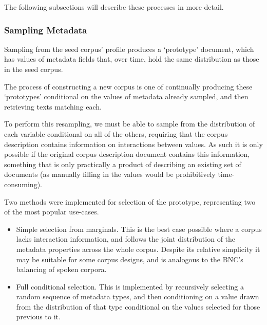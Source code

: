 The following subsections will describe these processes in more detail.

\subsubsection{Sampling Metadata}


Sampling from the seed corpus' profile produces a `prototype' document, which has values of metadata fields that, over time, hold the same distribution as those in the seed corpus.

The process of constructing a new corpus is one of continually producing these `prototypes' conditional on the values of metadata already sampled, and then retrieving texts matching each.

To perform this resampling, we must be able to sample from the distribution of each variable conditional on all of the others, requiring that the corpus description contains information on interactions between values.  As such it is only possible if the original corpus description document contains this information, something that is only practically a product of describing an existing set of documents (as manually filling in the values would be prohibitively time-consuming).

Two methods were implemented for selection of the prototype, representing two of the most popular use-cases.  

\begin{itemize}
    \item Simple selection from marginals.  This is the best case possible where a corpus lacks interaction information, and follows the joint distribution of the metadata properties across the whole corpus.  Despite its relative simplicity it may be suitable for some corpus designs, and is analogous to the BNC's balancing of spoken corpora.%
    \item Full conditional selection.  This is implemented by recursively selecting a random sequence of metadata types, and then conditioning on a value drawn from the distribution of that type conditional on the values selected for those previous to it.
\end{itemize}

